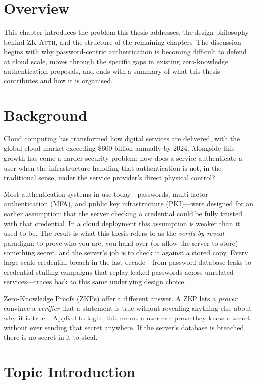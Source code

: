 \documentclass[12pt,a4paper,oneside]{report}
\begin{document}
\section{Overview}

This chapter introduces the problem this thesis addresses, the design
philosophy behind \textsc{ZK-Auth}, and the structure of the remaining
chapters. The discussion begins with why password-centric authentication
is becoming difficult to defend at cloud scale, moves through the
specific gaps in existing zero-knowledge authentication proposals, and
ends with a summary of what this thesis contributes and how it is
organised.

\section{Background}

Cloud computing has transformed how digital services are delivered, with
the global cloud market exceeding \$600 billion annually by 2024.
Alongside this growth has come a harder security problem: how does a
service authenticate a user when the infrastructure handling that
authentication is not, in the traditional sense, under the service
provider's direct physical control?

Most authentication systems in use today---passwords, multi-factor
authentication (MFA), and public key infrastructure (PKI)---were designed
for an earlier assumption: that the server checking a credential could be
fully trusted with that credential. In a cloud deployment this assumption
is weaker than it used to be. The result is what this thesis refers to as
the \textit{verify-by-reveal} paradigm: to prove who you are, you hand
over (or allow the server to store) something secret, and the server's
job is to check it against a stored copy. Every large-scale credential
breach in the last decade---from password database leaks to
credential-stuffing campaigns that replay leaked passwords across
unrelated services---traces back to this same underlying design choice.

Zero-Knowledge Proofs (ZKPs) offer a different answer. A ZKP lets a
\textit{prover} convince a \textit{verifier} that a statement is true
without revealing anything else about why it is true~\cite{gmr89}.
Applied to login, this means a user can prove they know a secret without
ever sending that secret anywhere. If the server's database is breached,
there is no secret in it to steal.

\section{Topic Introduction}
\end{document}
